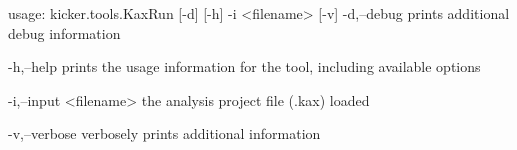 usage: kicker.tools.KaxRun [-d] [-h] -i <filename> [-v]
 -d,--debug
        prints additional debug information

 -h,--help
        prints the usage information for the tool, including available
        options

 -i,--input <filename>
        the analysis project file (.kax) loaded

 -v,--verbose
        verbosely prints additional information